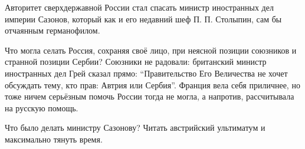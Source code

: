 Авторитет сверхдержавной России стал спасать министр иностранных дел империи
Сазонов, который как и его недавний шеф П. П. Столыпин, сам бы отчаянным
германофилом.

Что могла селать Россия, сохраняя своё лицо, при неясной позиции союзников и
странной позиции Сербии? Союзники не радовали: британский министр иностранных
дел Грей сказал прямо: \enquote{Правительство Его Величества не хочет обсуждать
тему, кто прав: Автрия или Сербия}. Франция вела себя приличнее, но тоже ничем
серьёзным помочь России тогда не могла, а напротив, рассчитывала на русскую
помощь.

Что было делать министру Сазонову? Читать австрийский ультиматум и максимально
тянуть время.
